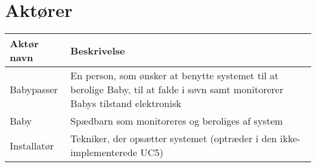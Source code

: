 \section{Aktører}



\begin{table}[!htbp] \centering
	\begin{tabular}{|p{2.5cm}|p{11.5cm}|}
	\hline
		\textbf{Aktør navn} & \textbf{Beskrivelse} \\\hline
		Babypasser 
		& En person, som ønsker at benytte systemet til at 
		  berolige Baby, til at falde i søvn samt monitorerer Babys tilstand elektronisk
		\\\hline
		Baby 
		& Spædbarn som monitoreres og beroliges af system
		\\\hline
		Installatør
		& Tekniker, der opsætter systemet (optræder i den ikke-implementerede UC5)
		\\\hline
	\end{tabular}
\end{table}